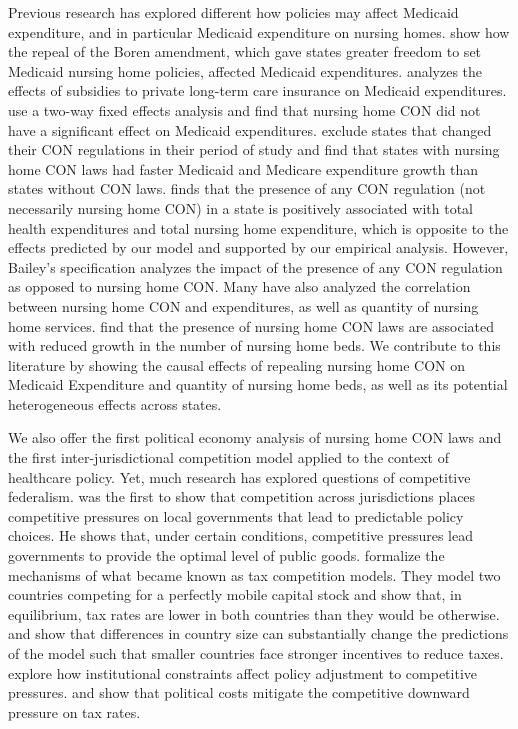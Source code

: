 \documentclass[../Main.tex]{subfiles}
\begin{document}
Previous research has explored different how policies may affect Medicaid expenditure, and in particular Medicaid expenditure on nursing homes. \citet{grabowski2004recent} show how the repeal of the Boren amendment, which gave states greater freedom to set Medicaid nursing home policies, affected Medicaid expenditures. \citet{goda2011impact} analyzes the effects of subsidies to private long-term care insurance on Medicaid expenditures. \citet{grabowski2003effects} use a two-way fixed effects analysis and find that nursing home CON did not have a significant effect on Medicaid expenditures. \citet{rahman2016impact} exclude states that changed their CON regulations in their period of study and find that states with nursing home CON laws had faster Medicaid and Medicare expenditure growth than states without CON laws. \citet{bailey2019can} finds that the presence of any CON regulation (not necessarily nursing home CON) in a state is positively associated with total health expenditures and total nursing home expenditure, which is opposite to the effects predicted by our model and supported by our empirical analysis. However, Bailey’s specification analyzes the impact of the presence of any CON regulation as opposed to nursing home CON. Many have also analyzed the correlation between nursing home CON and expenditures, as well as quantity of nursing home services. \citet{harrington1997effect,swan1991certificate,zinn1994market} find that the presence of nursing home CON laws are associated with reduced growth in the number of nursing home beds. We contribute to this literature by showing the causal effects of repealing nursing home CON on Medicaid Expenditure and quantity of nursing home beds, as well as its potential heterogeneous effects across states.   

We also offer the first political economy analysis of nursing home CON laws and the first inter-jurisdictional competition model applied to the context of healthcare policy. Yet, much research has explored questions of competitive federalism. \citet{tiebout1956pure} was the first to show that competition across jurisdictions places competitive pressures on local governments that lead to predictable policy choices. He shows that, under certain conditions, competitive pressures lead governments to provide the optimal level of public goods. \citet{zodrow1986pigou} formalize the mechanisms of what became known as tax competition models. They model two countries competing for a perfectly mobile capital stock and show that, in equilibrium, tax rates are lower in both countries than they would be otherwise. \citet{bucovetsky1991asymmetric} and \citet{kanbur1993jeux} show that differences in country size can substantially change the predictions of the model such that smaller countries face stronger incentives to reduce taxes. \citet{genschel2002globalization} explore how institutional constraints affect policy adjustment to competitive pressures. \citet{basinger2004remodeling} and \citet{plumper2009there} show that political costs mitigate the competitive downward pressure on tax rates. 
\end{document}
